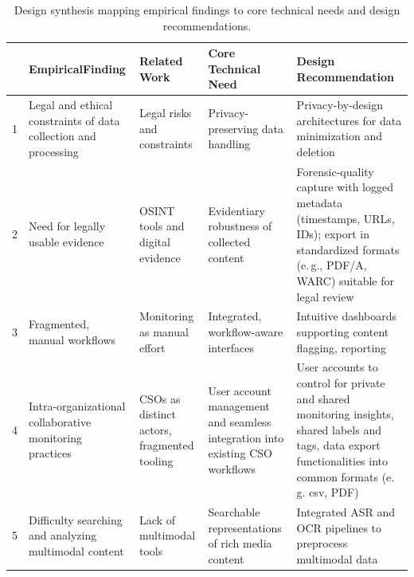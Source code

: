 \documentclass[acmsmall]{acmart}
\begin{document}
\begin{table}[htp]
\small
\centering
\caption{Design synthesis mapping empirical findings to core technical needs and design recommendations.}
\label{tab:design_synthesis}
\begin{tabular}
{p{} p{} p{} p{} p{}}
\toprule

\textbf{} &
\textbf{Empirical\newline Finding} &
\textbf{Related Work} &
\textbf{Core Technical Need} &
\textbf{Design Recommendation} \\
\midrule

1 & Legal and ethical constraints of data collection and processing & Legal risks and constraints \cite{baumler_harnessing_2025,hancock_seeing_2024,lakomy_open-source_2024} &
Privacy-preserving data handling & Privacy-by-design architectures for data minimization and deletion \\ \hline

2 & Need for legally usable evidence & OSINT tools and digital evidence  \cite{mckeown_investigating_2014,cifliku_save_2025,baumler_harnessing_2025,skopik_osint_nlp_2024} &  Evidentiary robustness of collected content  & Forensic-quality capture with logged metadata (timestamps, URLs, IDs); export in standardized formats (e.\,g., PDF/A, WARC) suitable for legal review \\ \hline
 
3 & Fragmented, manual workflows & Monitoring as manual effort \cite{beers_examining_2020,das_state_2023,juneja_human_2022} &
Integrated, workflow-aware interfaces  &
Intuitive dashboards supporting content flagging, reporting \\ \hline

4 & Intra-organizational collaborative monitoring practices & CSOs as distinct actors, fragmented tooling \cite{juneja_human_2022,baumler_harnessing_2025,micallef_true_2022} &
User account management and seamless integration into existing CSO workflows  & User accounts to control for private and shared monitoring insights, shared labels and tags, data export functionalities into common formats (e.\,g. csv, PDF) \\ \hline

5 & Difficulty searching and analyzing multimodal content & Lack of multimodal tools \cite{cifliku_save_2025, juneja_human_2022,liu_human-centered_2024,ayache2024whispernerunifiedopennamed} &
Searchable representations of rich media content &
Integrated ASR and OCR pipelines to preprocess multimodal data
\\ \hline


\end{tabular}
\end{table}
\end{document}
